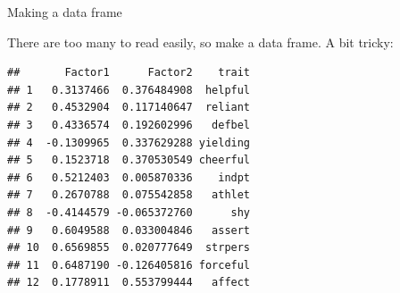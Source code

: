 \documentclass[ignorenonframetext,]{beamer}
\newenvironment{Shaded}{\begin{snugshade}}{\end{snugshade}}
\newcommand{\DataTypeTok}[1]{\textcolor[rgb]{0.13,0.29,0.53}{#1}}
\newcommand{\DecValTok}[1]{\textcolor[rgb]{0.00,0.00,0.81}{#1}}
\newcommand{\FloatTok}[1]{\textcolor[rgb]{0.00,0.00,0.81}{#1}}
\newcommand{\KeywordTok}[1]{\textcolor[rgb]{0.13,0.29,0.53}{\textbf{#1}}}
\newcommand{\NormalTok}[1]{#1}
\newcommand{\OperatorTok}[1]{\textcolor[rgb]{0.81,0.36,0.00}{\textbf{#1}}}
\newcommand{\StringTok}[1]{\textcolor[rgb]{0.31,0.60,0.02}{#1}}
\begin{document}
\begin{frame}[fragile]{Making a data frame}
\protect\hypertarget{making-a-data-frame}{}

There are too many to read easily, so make a data frame. A bit tricky:

\footnotesize

\begin{Shaded}
\end{Shaded}

\begin{verbatim}
##       Factor1      Factor2    trait
## 1   0.3137466  0.376484908  helpful
## 2   0.4532904  0.117140647  reliant
## 3   0.4336574  0.192602996   defbel
## 4  -0.1309965  0.337629288 yielding
## 5   0.1523718  0.370530549 cheerful
## 6   0.5212403  0.005870336    indpt
## 7   0.2670788  0.075542858   athlet
## 8  -0.4144579 -0.065372760      shy
## 9   0.6049588  0.033004846   assert
## 10  0.6569855  0.020777649  strpers
## 11  0.6487190 -0.126405816 forceful
## 12  0.1778911  0.553799444   affect
\end{verbatim}

\normalsize

\end{frame}
\end{document}
